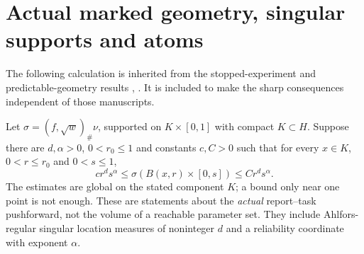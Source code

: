 \section{Actual marked geometry, singular supports and atoms}
The following calculation is inherited from the stopped-experiment and predictable-geometry results \cite{GTF52}, \cite{GTF54}. It is included to make the sharp consequences independent of those manuscripts.

Let $\sigma=(f,\sqrt w)_\#\nu$, supported on $K\times[0,1]$ with compact $K\subset H$. Suppose there are $d,\alpha>0$, $0<r_0\le1$ and constants $c,C>0$ such that for every $x\in K$, $0<r\le r_0$ and $0<s\le1$,
\begin{equation}\label{eq:rectangle}
 c r^d s^\alpha\le\sigma(B(x,r)\times[0,s])\le C r^d s^\alpha.
\end{equation}
The estimates are global on the stated component $K$; a bound only near one point is not enough. These are statements about the \emph{actual} report--task pushforward, not the volume of a reachable parameter set. They include Ahlfors-regular singular location measures of noninteger $d$ and a reliability coordinate with exponent $\alpha$.

